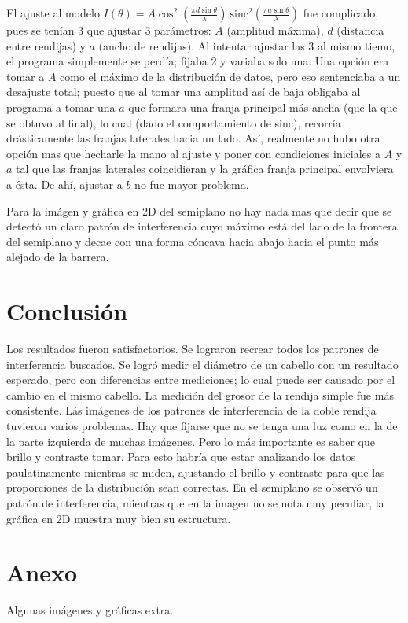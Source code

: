 \documentclass[12p]{article}
\begin{document}
El ajuste al modelo $I(\theta) = A \cos^2 \left ({\frac {\pi d \sin \theta}{\lambda}}\right)~\mathrm{sinc}^2 \left ( \frac {\pi a \sin \theta}{\lambda} \right)$ fue complicado, pues se tenían 3 que ajustar 3 parámetros: $A$ (amplitud máxima), $d$ (distancia entre rendijas) y $a$ (ancho de rendijas). Al intentar ajustar las 3 al mismo tiemo, el programa simplemente se perdía; fijaba 2 y variaba solo una. Una opción era tomar a $A$ como el máximo de la distribución de datos, pero eso sentenciaba a un desajuste total; puesto que al tomar una amplitud así de baja obligaba al programa a tomar una $a$ que formara una franja principal más ancha (que la que se obtuvo al final), lo cual (dado el comportamiento de sinc), recorría drásticamente las franjas laterales hacia un lado. Así, realmente no hubo otra opción mas que hecharle la mano al ajuste y poner con condiciones iniciales a $A$ y $a$ tal que las franjas laterales coincidieran y la gráfica franja principal envolviera a ésta. De ahí, ajustar a $b$ no fue mayor problema.

Para la imágen y gráfica en 2D del semiplano no hay nada mas que decir que se detectó un claro patrón de interferencia cuyo máximo está del lado de la frontera del semiplano y decae con una forma cóncava hacia abajo hacia el punto más alejado de la barrera.

\section{Conclusión}
\noindent Los resultados fueron satisfactorios. Se lograron recrear todos los patrones de interferencia buscados. Se logró medir el diámetro de un cabello con un resultado esperado, pero con diferencias entre mediciones; lo cual puede ser causado por el cambio en el mismo cabello. La medición del grosor de la rendija simple fue más consistente. Lás imágenes de los patrones de interferencia de la doble rendija tuvieron varios problemas. Hay que fijarse que no se tenga una luz como en la de la parte izquierda de muchas imágenes. Pero lo más importante es saber que brillo y contraste tomar. Para esto habría que estar analizando los datos paulatinamente mientras se miden, ajustando el brillo y contraste para que las proporciones de la distribución sean correctas. En el semiplano se observó un patrón de interferencia, mientras que en la imagen no se nota muy peculiar, la gráfica en 2D muestra muy bien su estructura.

\section{Anexo}
Algunas imágenes y gráficas extra.
\end{document}
